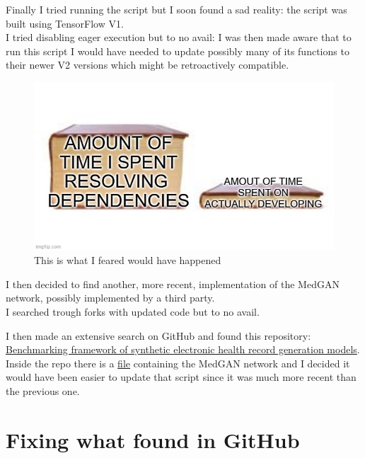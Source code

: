 \documentclass[
  letterpaper,
  DIV=11,
  numbers=noendperiod]{scrreprt}
\begin{document}
Finally I tried running the script but I soon found a sad reality: the
script was built using TensorFlow V1.\\
I tried disabling eager execution but to no avail: I was then made aware
that to run this script I would have needed to update possibly many of
its functions to their newer V2 versions which might be retroactively
compatible.

\begin{figure}

{\centering \includegraphics{upgrade_TF.png}

}

\caption{This is what I feared would have happened}

\end{figure}

I then decided to find another, more recent, implementation of the
MedGAN network, possibly implemented by a third party.\\
I searched trough forks with updated code but to no avail.

I then made an extensive search on GitHub and found this repository:
\href{https://github.com/yy6linda/synthetic-ehr-benchmarking}{Benchmarking
framework of synthetic electronic health record generation models}.\\
Inside the repo there is a
\href{https://github.com/yy6linda/synthetic-ehr-benchmarking/blob/main/data_generation/vumc/medgan_vumc.py}{file}
containing the MedGAN network and I decided it would have been easier to
update that script since it was much more recent than the previous one.

\hypertarget{fixing-what-found-in-github}{%
\chapter{Fixing what found in
GitHub}\label{fixing-what-found-in-github}}
\end{document}

